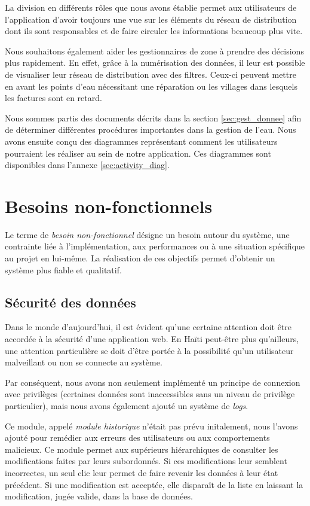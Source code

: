 \documentclass{EPL-master-thesis-covers-FR}
\begin{document}
				La division en différents rôles que nous avons établie permet aux utilisateurs de l'application d'avoir toujours une vue sur les éléments du réseau de distribution dont ils sont responsables et de faire circuler les informations beaucoup plus vite.

				Nous souhaitons également aider les gestionnaires de zone à prendre des décisions plus rapidement. En effet, grâce à la numérisation des données, il leur est possible de visualiser leur réseau de distribution avec des filtres. Ceux-ci peuvent mettre en avant les points d'eau nécessitant une réparation ou les villages dans lesquels les factures sont en retard.

				Nous sommes partis des documents décrits dans la section \ref{sec:gest_donnee} afin de déterminer différentes procédures importantes dans la gestion de l'eau. Nous avons ensuite conçu des diagrammes représentant comment les utilisateurs pourraient les réaliser au sein de notre application. Ces diagrammes sont disponibles dans l'annexe \ref{sec:activity_diag}.

		\section{Besoins non-fonctionnels}


			Le terme de \emph{besoin non-fonctionnel} désigne un besoin autour du système, une contrainte liée à l'implémentation, aux performances ou à une situation spécifique au projet en lui-même. La réalisation de ces objectifs permet d'obtenir un système plus fiable et qualitatif.

			\subsection*{Sécurité des données}

				Dans le monde d'aujourd'hui, il est évident qu'une certaine attention doit être accordée à la sécurité d'une application web. En Haïti peut-être plus qu'ailleurs, une attention particulière se doit d'être portée à la possibilité qu'un utilisateur malveillant ou non se connecte au système.

				Par conséquent, nous avons non seulement implémenté un principe de connexion avec privilèges (certaines données sont inaccessibles sans un niveau de privilège particulier), mais nous avons également ajouté un système de \emph{logs}.

				Ce module, appelé \emph{module historique} n'était pas prévu initalement, nous l'avons ajouté pour remédier aux erreurs des utilisateurs ou aux comportements malicieux. Ce module permet aux supérieurs hiérarchiques de consulter les modifications faites par leurs subordonnés. Si ces modifications leur semblent incorrectes, un seul clic leur permet de faire revenir les données à leur état précédent. Si une modification est acceptée, elle disparaît de la liste en laissant la modification, jugée valide, dans la base de données.
\end{document}
